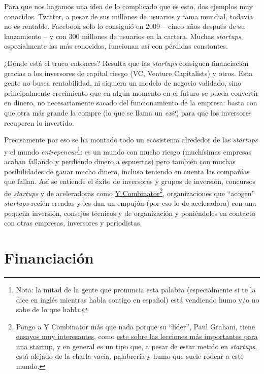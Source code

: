 \documentclass[nochap,palatino,shortheader]{apuntes}
\begin{document}
Para que nos hagamos una idea de lo complicado que es esto, dos ejemplos muy conocidos. Twitter, a pesar de sus millones de usuarios y fama mundial, todavía no es rentable. Facebook sólo lo consiguió en 2009 -- cinco años después de su lanzamiento -- y con 300 millones de usuarios en la cartera. Muchas \textit{startups}, especialmente las más conocidas, funcionan así con pérdidas constantes.

¿Dónde está el truco entonces? Resulta que las \textit{startups} consiguen financiación gracias a los inversores de capital riesgo (VC, Venture Capitalists) y otros. Esta gente no busca rentabilidad, ni siquiera un modelo de negocio validado, sino principalmente crecimiento que en algún momento en el futuro se pueda convertir en dinero, no necesariamente sacado del funcionamiento de la empresa: basta con que otra más grande la compre (lo que se llama un \textit{exit}) para que los inversores recuperen lo invertido.

Precisamente por eso se ha montado todo un ecosistema alrededor de las \textit{startups} y el mundo \textit{entrepeneur}\footnote{Nota: la mitad de la gente que pronuncia esta palabra (especialmente si te la dice en inglés mientras habla contigo en español) está vendiendo humo y/o no sabe de lo que habla.}: es un mundo con mucho riesgo (muchísimas empresas acaban fallando y perdiendo dinero a espuertas) pero también con muchas posibilidades de ganar mucho dinero, incluso teniendo en cuenta las compañías que fallan. Así se entiende el éxito de inversores y grupos de inversión, concursos de \textit{startups} y de aceleradoras como \href{https://www.ycombinator.com/}{Y Combinator}\footnote{Pongo a Y Combinator más que nada porque su ``líder'', Paul Graham, tiene \href{http://paulgraham.com/articles.html}{ensayos muy interesantes}, como \href{http://paulgraham.com/startuplessons.html}{este sobre las lecciones más importantes para una startup}, y en general es un tipo que, a pesar de estar metido en \textit{startups}, está alejado de la charla vacía, palabrería y humo que suele rodear a este mundo.}, organizaciones que ``acogen'' \textit{startups} recién creadas y les dan un empujón (por eso lo de aceleradora) con una pequeña inversión, consejos técnicos y de organización y poniéndoles en contacto con otras empresas, inversores y periodistas.

\section{Financiación}
\end{document}
